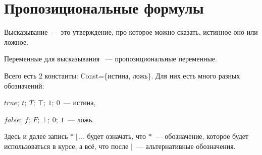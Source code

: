 \documentclass[main]{subfiles}
\begin{document}
\chapter{Пропозициональные формулы}
\begin{definition}[Высказывание]
    Высказывание~--- это утверждение, про которое можно сказать, истинное оно или ложное.
\end{definition}
\begin{definition}
    Переменные для высказывания ~--- пропозициональные переменные.
\end{definition}
Всего есть 2 константы: Const=\{истина, ложь\}.
Для них есть много разных обозначений:

$true;\ t;\ T;\ \top;\ 1;\ 0$~--- истина,

$false;\ f;\ F;\ \bot;\ 0;\ 1$~--- ложь.

Здесь и далее запись $*\ |\ \dots$ будет означать, что $*$~--- обозначение, которое будет использоваться в курсе, а всё, что после $|$~--- альтернативные обозначения.
\end{document}
